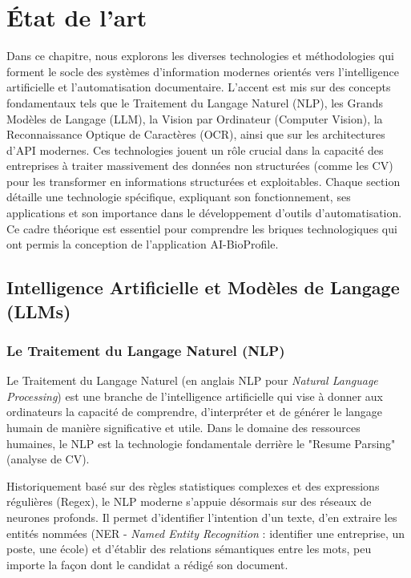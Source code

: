 
\chapter{État de l'art}

Dans ce chapitre, nous explorons les diverses technologies et méthodologies qui forment le socle des systèmes d'information modernes orientés vers l'intelligence artificielle et l'automatisation documentaire. L'accent est mis sur des concepts fondamentaux tels que le Traitement du Langage Naturel (NLP), les Grands Modèles de Langage (LLM), la Vision par Ordinateur (Computer Vision), la Reconnaissance Optique de Caractères (OCR), ainsi que sur les architectures d'API modernes. Ces technologies jouent un rôle crucial dans la capacité des entreprises à traiter massivement des données non structurées (comme les CV) pour les transformer en informations structurées et exploitables. Chaque section détaille une technologie spécifique, expliquant son fonctionnement, ses applications et son importance dans le développement d'outils d'automatisation. Ce cadre théorique est essentiel pour comprendre les briques technologiques qui ont permis la conception de l'application AI-BioProfile.

\section{Intelligence Artificielle et Modèles de Langage (LLMs)}

\subsection{Le Traitement du Langage Naturel (NLP)}
Le Traitement du Langage Naturel (en anglais NLP pour \textit{Natural Language Processing}) est une branche de l'intelligence artificielle qui vise à donner aux ordinateurs la capacité de comprendre, d'interpréter et de générer le langage humain de manière significative et utile. Dans le domaine des ressources humaines, le NLP est la technologie fondamentale derrière le "Resume Parsing" (analyse de CV).

Historiquement basé sur des règles statistiques complexes et des expressions régulières (Regex), le NLP moderne s'appuie désormais sur des réseaux de neurones profonds. Il permet d'identifier l'intention d'un texte, d'en extraire les entités nommées (NER - \textit{Named Entity Recognition} : identifier une entreprise, un poste, une école) et d'établir des relations sémantiques entre les mots, peu importe la façon dont le candidat a rédigé son document.


